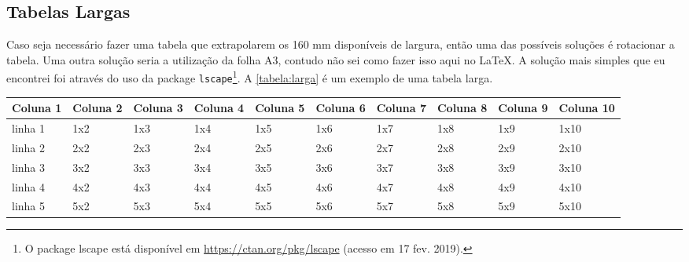 \documentclass[
  12pt,		%
  a4paper,	%
  openright,%
  oneside,	%
  chapter=TITLE,		%
  section=TITLE,		%
  english,	%
  french,	%
  spanish,	%
  brazil
]{abntex2}
\begin{document}
             \subsection {Tabelas Largas}
             \label{chapter:exemplos:tabelas_larga}
             
             Caso seja necessário fazer uma tabela que extrapolarem os 160 mm disponíveis de largura, então uma das possíveis soluções é rotacionar a tabela.  Uma outra solução seria a utilização da folha A3, contudo não sei como fazer isso aqui no \LaTeX. A solução mais simples que eu encontrei foi através do uso da package \verb|lscape|\footnote{O package lscape está disponível em \url{https://ctan.org/pkg/lscape} (acesso em 17 fev. 2019).}. A \autoref{tabela:larga} é um exemplo de uma tabela larga.
             
             
             \begin{landscape}
                \begin{table}
                {
                \begin{tabular}{llllllllll}
                        \toprule
                        \textbf{Coluna 1} & \textbf{Coluna 2} & \textbf{Coluna 3} & \textbf{Coluna 4} & \textbf{Coluna 5} & \textbf{Coluna 6} & \textbf{Coluna 7} & \textbf{Coluna 8} & \textbf{Coluna 9} & \textbf{Coluna 10} \\
                        \midrule
                        linha 1 & 1x2 & 1x3 & 1x4 & 1x5 & 1x6 & 1x7 & 1x8 & 1x9 & 1x10 \\
                        linha 2 & 2x2 & 2x3 & 2x4 & 2x5 & 2x6 & 2x7 & 2x8 & 2x9 & 2x10 \\
                        linha 3 & 3x2 & 3x3 & 3x4 & 3x5 & 3x6 & 3x7 & 3x8 & 3x9 & 3x10 \\
                        linha 4 & 4x2 & 4x3 & 4x4 & 4x5 & 4x6 & 4x7 & 4x8 & 4x9 & 4x10 \\
                        linha 5 & 5x2 & 5x3 & 5x4 & 5x5 & 5x6 & 5x7 & 5x8 & 5x9 & 5x10 \\
                        \bottomrule
                    
                    \end{tabular}
                    }
                    {
                    }
                
                \end{table}
            \end{landscape}
             
\end{document}
